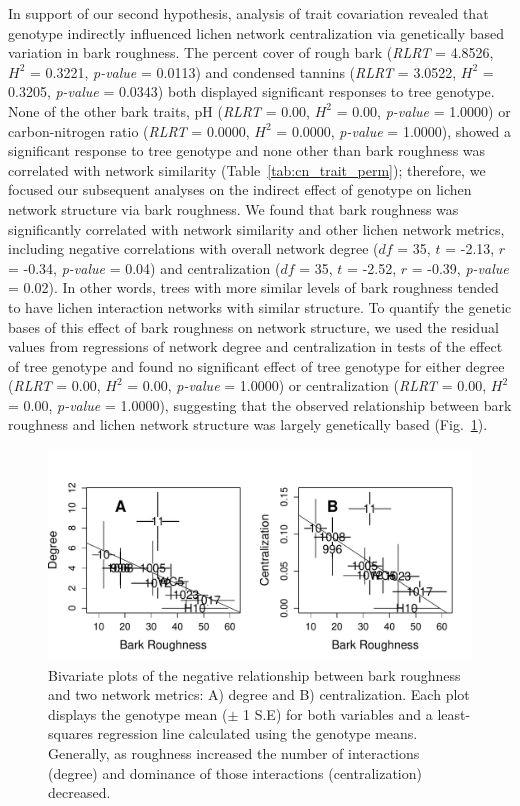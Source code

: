 \documentclass[fleqn,12pt]{olplainarticle}
\begin{document}
In support of our second hypothesis, analysis of trait covariation
revealed that genotype indirectly influenced lichen network
centralization via genetically based variation in bark roughness. The
percent cover of rough bark (\textit{RLRT} = 4.8526, $H^2$ = 0.3221,
\textit{p-value} = 0.0113) and condensed tannins (\textit{RLRT} =
3.0522, $H^2$ = 0.3205, \textit{p-value} = 0.0343) both displayed
significant responses to tree genotype. None of the other bark traits,
pH (\textit{RLRT} = 0.00, $H^2$ = 0.00, \textit{p-value} = 1.0000) or
carbon-nitrogen ratio (\textit{RLRT} = 0.0000, $H^2$ = 0.0000,
\textit{p-value} = 1.0000), showed a significant response to tree
genotype and none other than bark roughness was correlated with
network similarity (Table~\ref{tab:cn_trait_perm}); therefore, we
focused our subsequent analyses on the indirect effect of genotype on
lichen network structure via bark roughness. We found that bark
roughness was significantly correlated with network similarity and
other lichen network metrics, including negative correlations with
overall network degree ($df$ = 35, $t$ = -2.13, $r$ = -0.34,
\textit{p-value} = 0.04) and centralization ($df$ = 35, $t$ = -2.52,
$r$ = -0.39, \textit{p-value} = 0.02). In other words, trees with more
similar levels of bark roughness tended to have lichen interaction
networks with similar structure. To quantify the genetic bases of this
effect of bark roughness on network structure, we used the residual
values from regressions of network degree and centralization in tests
of the effect of tree genotype and found no significant effect of tree
genotype for either degree (\textit{RLRT} = 0.00, $H^2$ = 0.00,
\textit{p-value} = 1.0000) or centralization (\textit{RLRT} = 0.00,
$H^2$ = 0.00, \textit{p-value} = 1.0000), suggesting that the observed
relationship between bark roughness and lichen network structure was
largely genetically based (Fig.~\ref{fig:br_net}).



\begin{figure}[ht]
\centering
\includegraphics[width=\linewidth]{figures/br_net.pdf}
\caption{Bivariate plots of the negative relationship between bark
  roughness and two network metrics: A) degree and B)
  centralization. Each plot displays the genotype mean ($\pm$ 1 S.E)
  for both variables and a least-squares regression line calculated
  using the genotype means. Generally, as roughness increased the
  number of interactions (degree) and dominance of
  those interactions (centralization) decreased.}
\label{fig:br_net}
\end{figure}
\end{document}
